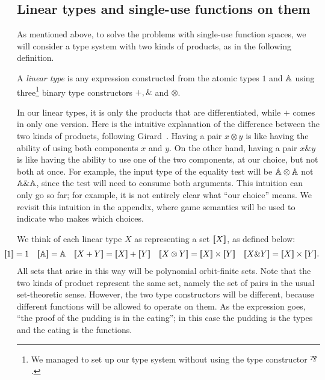 \subsection{Linear types and single-use functions on them}
\label{sec:linear-types-and-single-use-functions}
As mentioned above, to solve the problems with single-use function spaces, we will consider a type system with two kinds of products, as in the following definition.
\begin{definition}\label{def:datatypes}
    A \emph{linear type} is any expression constructed from the atomic types $1$ and $\mathbb A$ using three\footnote{We managed to set up our type system without using the type constructor  $\rotatebox[origin=c]{180}{\&}$.} binary type constructors $+, \&$ and $\otimes$. 
\end{definition}
In our linear types, it is only the products that are differentiated, while  $+$ comes in only one version. 
    Here is the intuitive explanation of the difference between the two kinds of products, following Girard~\cite[p.2]{girard1995advances}. Having a pair $x \otimes y$ is like having the ability of using both components $x$ and $y$. On the other hand, having a pair $x \& y$ is like having the ability to use one of the two components, at our choice, but not both at once. For example, the input type of the equality test will be $\mathbb A \otimes \mathbb A$ not $\mathbb A \& \mathbb A$, since the test will need to consume both arguments. This intuition can only go so far; for example, it is not entirely clear what ``our choice'' means. We revisit this intuition in  the appendix, where game semantics will be used to indicate who makes which choices. 



We think of each linear type $X$ as representing a set $[{\kern-0.45ex}[X]{\kern-0.45ex}]$, as defined below:
\begin{align*}
\hspace{-0.6cm}
    \sem{1} = 1
\quad 
\sem{\atoms} = \atoms 
\quad 
\sem{X+Y} = \sem X + \sem Y 
\quad 
\sem{X \otimes Y} = \sem X \times \sem Y 
\quad
\sem{X \& Y} = \sem X \times \sem Y.
\end{align*}
All sets that arise in this way will be polynomial orbit-finite sets.
Note that the two kinds of product represent the same set, namely the set of pairs in the usual set-theoretic sense. 
However, the two type constructors will be  different, because different functions will be allowed to operate on them. As the expression goes, ``the proof of the pudding is in the eating''; in this case the pudding is the types and the eating is the functions.  

